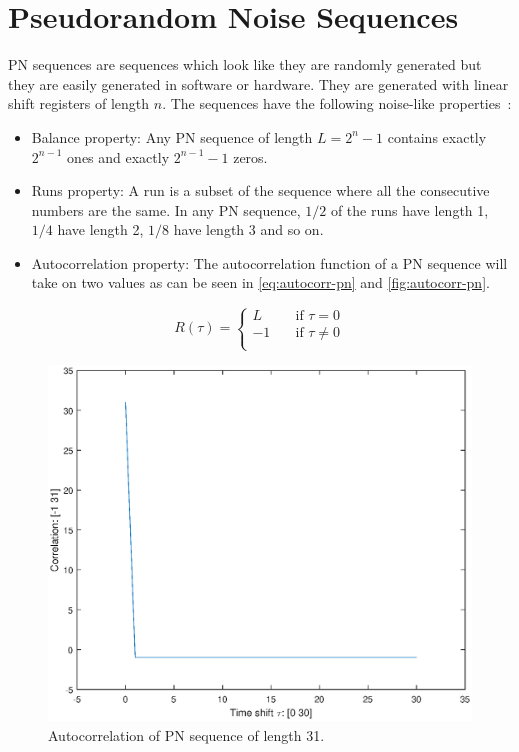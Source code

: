 
\section{Pseudorandom Noise Sequences}

PN sequences are sequences which look like they are randomly generated but they are easily generated in software or hardware.
They are generated with linear shift registers of length $n$.
The sequences have the following noise-like properties~\cite{mitra2008pseudo}:

\begin{itemize}
	\item Balance property:	Any PN sequence of length $L = 2^n - 1$ contains exactly $2^{n-1}$ ones and exactly $2^{n-1} - 1$ zeros.

	\item Runs property: A run is a subset of the sequence where all the consecutive numbers are the same. In any PN sequence, $1/2$ of the runs have length 1, $1/4$ have length 2, $1/8$ have length 3 and so on.

	\item Autocorrelation property: The autocorrelation function of a PN sequence will take on two values as can be seen in \autoref{eq:autocorr-pn} and \autoref{fig:autocorr-pn}.


\end{itemize}

\begin{equation}
	\label{eq:autocorr-pn}
	R(\tau) = 
		\begin{cases}
			L    & \quad \text{if } \tau = 0 \\
			-1   & \quad \text{if } \tau \neq 0 \\
		\end{cases}
\end{equation}

\begin{figure}[h]
	\centering
	\includegraphics[width=\textwidth]{chapters/cdma-chapters/autocorr-pn.eps}
	\caption{Autocorrelation of PN sequence of length 31.}
	\label{fig:autocorr-pn}
\end{figure}

